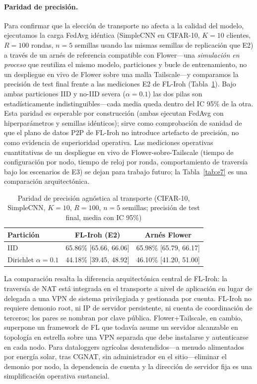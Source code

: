 \documentclass[journal]{IEEEtran}
\begin{document}
\paragraph{Paridad de precisión.}
Para confirmar que la elección de transporte no afecta a la calidad del modelo, ejecutamos la carga FedAvg idéntica (SimpleCNN en CIFAR-10, $K{=}10$ clientes, $R{=}100$ rondas, $n{=}5$ semillas usando las mismas semillas de replicación que E2) a través de un arnés de referencia compatible con Flower---una \emph{simulación en proceso} que reutiliza el mismo modelo, particiones y bucle de entrenamiento, no un despliegue en vivo de Flower sobre una malla Tailscale---y comparamos la precisión de test final frente a las mediciones E2 de FL-Iroh (Tabla~\ref{tab:e7acc}). Bajo ambas particiones IID y no-IID severa ($\alpha{=}0.1$) las dos pilas son estadísticamente indistinguibles---cada media queda dentro del IC 95\% de la otra. Esta paridad es esperable por construcción (ambas ejecutan FedAvg con hiperparámetros y semillas idénticos); sirve como comprobación de sanidad de que el plano de datos P2P de FL-Iroh no introduce artefacto de precisión, no como evidencia de superioridad operativa. Las mediciones operativas cuantitativas de un despliegue en vivo de Flower-sobre-Tailscale (tiempo de configuración por nodo, tiempo de reloj por ronda, comportamiento de traversía bajo los escenarios de E3) se dejan para trabajo futuro; la Tabla~\ref{tab:e7} es una comparación arquitectónica.

\begin{table}[t]
\centering
\caption{Paridad de precisión agnóstica al transporte (CIFAR-10, SimpleCNN, $K{=}10$, $R{=}100$, $n{=}5$ semillas; precisión de test final, media con IC 95\%)}
\label{tab:e7acc}
\footnotesize
\renewcommand{\arraystretch}{1.25}
\begin{tabular}{l c c}
\toprule
\textbf{Partición} & \textbf{FL-Iroh (E2)} & \textbf{Arnés Flower} \\
\midrule
IID                      & 65.86\% [65.66, 66.06] & 65.98\% [65.79, 66.17] \\
Dirichlet $\alpha{=}0.1$ & 44.18\% [39.45, 48.92] & 46.10\% [41.20, 51.00] \\
\bottomrule
\end{tabular}
\end{table}

La comparación resalta la diferencia arquitectónica central de FL-Iroh: la traversía de NAT está integrada en el transporte a nivel de aplicación en lugar de delegada a una VPN de sistema privilegiada y gestionada por cuenta. FL-Iroh no requiere demonio root, ni IP de servidor persistente, ni cuenta de coordinación de terceros; los pares se nombran por clave pública. Flower+Tailscale, en cambio, superpone un framework de FL que todavía asume un servidor alcanzable en topología en estrella sobre una VPN separada que debe instalarse y autenticarse en cada nodo. Para dataloggers agrícolas desatendidos---a menudo alimentados por energía solar, tras CGNAT, sin administrador en el sitio---eliminar el demonio por nodo, la dependencia de cuenta y la dirección de servidor fija es una simplificación operativa sustancial.
\end{document}
